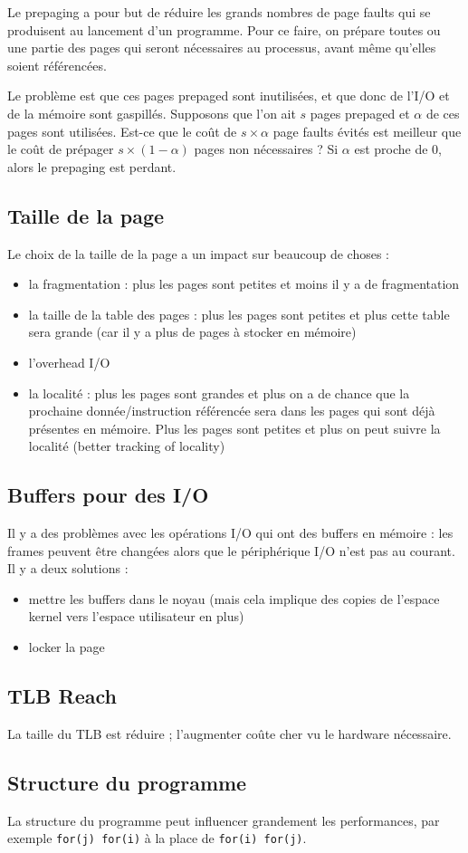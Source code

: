 	Le prepaging a pour but de réduire les grands nombres de page faults qui se produisent au lancement d'un programme. Pour ce faire, on prépare toutes ou une partie des pages qui seront nécessaires au processus, avant même qu'elles soient référencées.
	
	Le problème est que ces pages prepaged sont inutilisées, et que donc de l'I/O et de la mémoire sont gaspillés. Supposons que l'on ait $s$ pages prepaged et $\alpha$ de ces pages sont utilisées. Est-ce que le coût de $s \times \alpha$ page faults évités est meilleur que le coût de prépager $s \times (1 - \alpha)$ pages non nécessaires ? Si $\alpha$ est proche de 0, alors le prepaging est perdant.
	
	
	\subsection{Taille de la page}
	
	Le choix de la taille de la page a un impact sur beaucoup de choses :
	
	\begin{itemize}
		\item la fragmentation : plus les pages sont petites et moins il y a de fragmentation
		\item la taille de la table des pages : plus les pages sont petites et plus cette table sera grande (car il y a plus de pages à stocker en mémoire)
		\item l'overhead I/O
		\item la localité : plus les pages sont grandes et plus on a de chance que la prochaine donnée/instruction référencée sera dans les pages qui sont déjà présentes en mémoire. Plus les pages sont petites et plus on peut suivre la localité (better tracking of locality)
	\end{itemize}
	
	
	\subsection{Buffers pour des I/O}
	
	Il y a des problèmes avec les opérations I/O qui ont des buffers en mémoire : les frames peuvent être changées alors que le périphérique I/O n'est pas au courant. Il y a deux solutions :
	
	\begin{itemize}
		\item mettre les buffers dans le noyau (mais cela implique des copies de l'espace kernel vers l'espace utilisateur en plus)
		\item locker la page
	\end{itemize}
	
	\subsection{TLB Reach}
	
	La taille du TLB est réduire ; l'augmenter coûte cher vu le hardware nécessaire.
	
	\subsection{Structure du programme}
	
	La structure du programme peut influencer grandement les performances, par exemple \texttt{for(j) for(i)} à la place de \texttt{for(i) for(j)}.